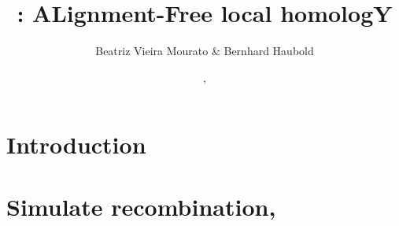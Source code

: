 \documentclass[a4paper]{report}
\begin{document}
\title{: ALignment-Free local homologY}
\author{Beatriz Vieira Mourato \& Bernhard Haubold}
\date{\!\!, }
\maketitle

\chapter{Introduction}
\label{ch:int}
\chapter{}

\chapter{Simulate recombination, }

\chapter{}



\end{document}
